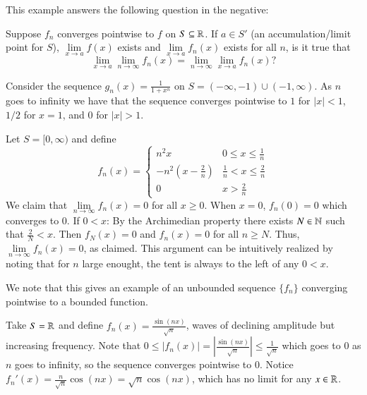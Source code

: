 \documentclass[12pt, a4paper, oneside, openright, titlepage]{book}
\begin{document}
This example answers the following question in the negative:

\begin{qst}
    Suppose $f_n$ converges pointwise to $f$ on $S \subseteq \mathbb R$. If $a \in S'$ (an accumulation/limit point for $S$), $\lim\limits_{x\rightarrow a}f(x)$ exists and $\lim\limits_{x\rightarrow a}f_n(x)$ exists for all $n$, is it true that \begin{equation*}
        \lim\limits_{x\rightarrow a}\lim\limits_{n\rightarrow \infty}f_n(x) = \lim\limits_{n\rightarrow \infty}\lim\limits_{x\rightarrow a}f_n(x)?
    \end{equation*}
\end{qst}


\begin{eg}
    Consider the sequence $g_n(x) = \frac{1}{1+x^n}$ on $S = (-\infty,-1)\cup(-1,\infty)$. As $n$ goes to infinity we have that the sequence converges pointwise to $1$ for $|x| < 1$, $1/2$ for $x = 1$, and $0$ for $|x| > 1$.
\end{eg}

\begin{eg}
    Let $S = [0,\infty)$ and define \begin{equation*}
        f_n(x) = \left\{\begin{array}{lc} n^2x & 0 \leq x \leq \frac{1}{n} \\ -n^2\left(x-\frac{2}{n}\right) & \frac{1}{n} < x \leq \frac{2}{n} \\ 0 & x > \frac{2}{n}\end{array}\right.
    \end{equation*}
    We claim that $\lim\limits_{n\rightarrow \infty}f_n(x) = 0$ for all $x \geq 0$. When $x=0$, $f_n(0) = 0$ which converges to $0$. If $0 < x$: By the Archimedian property there exists $N \in \mathbb N$ such that $\frac{2}{N} < x$. Then $f_N(x) = 0$ and $f_n(x) = 0$ for all $n \geq N$. Thus, $\lim\limits_{n\rightarrow \infty}f_n(x) = 0$, as claimed. This argument can be intuitively realized by noting that for $n$ large enought, the tent is always to the left of any $0 < x$.
\end{eg}

We note that this gives an example of an unbounded sequence $\{f_n\}$ converging pointwise to a bounded function.

\begin{eg}
    Take $S = \mathbb R$ and define $f_n(x) = \frac{\sin(nx)}{\sqrt{n}}$, waves of declining amplitude but increasing frequency. Note that $0 \leq |f_n(x)| = \left|\frac{\sin(nx)}{\sqrt{n}}\right| \leq \frac{1}{\sqrt{n}}$ which goes to $0$ as $n$ goes to infinity, so the sequence converges pointwise to $0$. Notice $f_n'(x) = \frac{n}{\sqrt{n}}\cos(nx) = \sqrt{n}\cos(nx)$, which has no limit for any $x \in \mathbb R$.
\end{eg}
\end{document}

